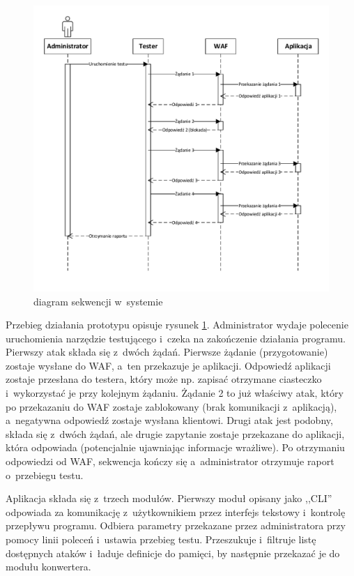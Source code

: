\documentclass[12pt,a4paper,polish,thesis]{dcsbook}
\begin{document}
\begin{figure}
\centering
\centerline{\includegraphics{schemat.pdf}}
\caption{diagram sekwencji w~systemie}
\label{fig:przeplyw}
\end{figure}


Przebieg działania prototypu opisuje rysunek \ref{fig:przeplyw}. Administrator wydaje polecenie uruchomienia narzędzie testującego i~czeka na zakończenie działania programu. Pierwszy atak składa się z~dwóch żądań. Pierwsze żądanie (przygotowanie) zostaje wysłane do WAF, a~ten przekazuje je aplikacji. Odpowiedź aplikacji zostaje przesłana do testera, który może np. zapisać otrzymane ciasteczko i~wykorzystać je przy kolejnym żądaniu. Żądanie 2 to już właściwy atak, który po przekazaniu do WAF zostaje zablokowany (brak komunikacji z~aplikacją), a~negatywna odpowiedź zostaje wysłana klientowi. Drugi atak jest podobny, składa się z~dwóch żądań, ale drugie zapytanie zostaje przekazane do aplikacji, która odpowiada (potencjalnie ujawniając informacje wrażliwe). Po otrzymaniu odpowiedzi od WAF, sekwencja kończy się a~administrator otrzymuje raport o~przebiegu testu.

Aplikacja składa się z~trzech modułów. Pierwszy moduł opisany jako ,,CLI'' odpowiada za komunikację z~użytkownikiem przez interfejs tekstowy i~kontrolę przepływu programu. Odbiera parametry przekazane przez administratora przy pomocy linii poleceń i~ustawia przebieg testu. Przeszukuje i~filtruje listę dostępnych ataków i~ładuje definicje do pamięci, by następnie przekazać je do modułu konwertera.
\end{document}
